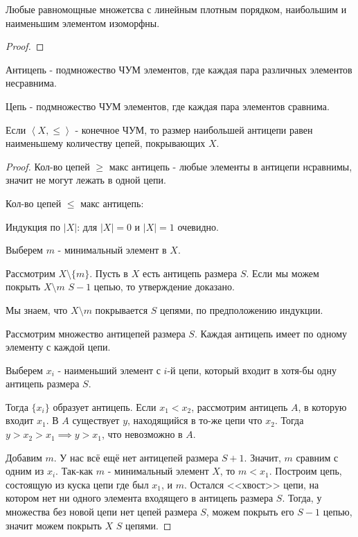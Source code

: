 \begin{theorem} \thmslashn

    Любые равномощные множетсва с линейным плотным порядком, наибольшим и наименьшим элементом изоморфны.
    \begin{proof} \thmslashn
    
        \TODO
    \end{proof}
\end{theorem}
\begin{definition} \thmslashn 

    Антицепь - подмножество ЧУМ элементов, где каждая пара различных элементов несравнима.
\end{definition}
\begin{definition} \thmslashn 

    Цепь - подмножество ЧУМ элементов, где каждая пара элементов сравнима.
\end{definition}
\begin{theorem} \thmslashn

    Если $\left<X, \le \right>$ - конечное ЧУМ, то размер наибольшей антицепи равен наименьшему количеству цепей, покрывающих $X$.
    \begin{proof} \thmslashn
    
       Кол-во цепей $\ge $ макс антицепь - любые элементы в антицепи нсравнимы, значит не могут лежать в одной цепи.

       Кол-во цепей $\le $ макс антицепь:

       Индукция по $|X|$: для $|X| = 0$ и $|X| =1$ очевидно.

       Выберем $m$ - минимальный элемент в $X$.

       Рассмотрим $X \setminus \{m\} $. Пусть в $X$ есть антицепь размера $S$. Если мы можем покрыть $X \setminus m$ $S - 1$ цепью, то утверждение доказано. 

       Мы знаем, что $X \setminus m$ покрывается $S$ цепями, по предположению индукции.

       Рассмотрим множество антицепей размера $S$. Каждая антицепь имеет по одному элементу с каждой цепи.

       Выберем $x_{i}$ - наименьший элемент с $i$-й цепи, который входит в хотя-бы одну антицепь размера $S$.

       Тогда $\{x_{i}\} $ образует антицепь. Если $x_1 < x_2$, рассмотрим антицепь $A$, в которую входит $x_1$. В $A$ существует $y$, находящийся в то-же цепи что $x_2$. Тогда $y > x_2 > x_1 \implies y > x_1$, что невозможно в $A$.

        Добавим $m$.  У нас всё ещё нет антицепей размера $S + 1$. Значит,  $m$ сравним с одним из  $x_{i}$. Так-как $m$ - минимальный элемент  $X$, то  $m < x_1$. Построим цепь, состоящую из куска цепи где был $x_1$, и $m$. Остался <<хвост>> цепи, на котором нет ни одного элемента входящего в антицепь размера  $S$. Тогда, у множества без новой цепи нет цепей размера  $S$, можем покрыть его  $S-1$ цепью, значит можем покрыть  $X$  $S$ цепями. 
   \end{proof}
\end{theorem}
